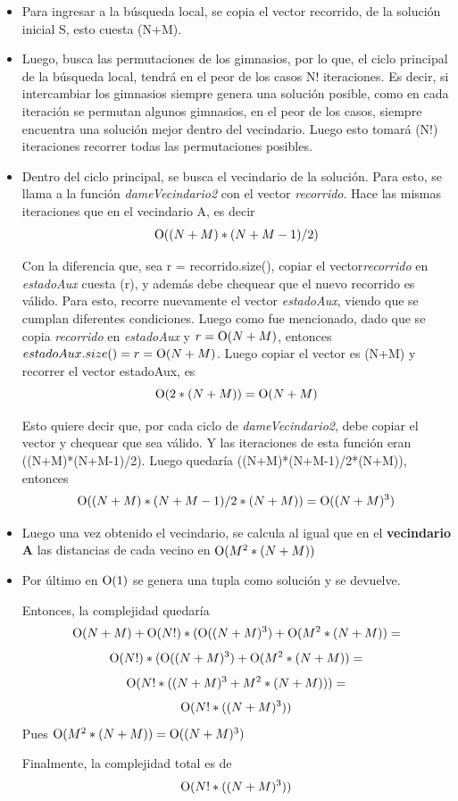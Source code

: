         \begin{itemize}
            \item Para ingresar a la búsqueda local, se copia el vector recorrido, de la solución inicial S, esto cuesta \ord(N+M).
            \item Luego, busca las permutaciones de los gimnasios, por lo que, el ciclo principal de la búsqueda local, tendrá en el peor de los casos N! iteraciones. Es decir, si intercambiar los gimnasios siempre genera una solución posible, como en cada iteración se permutan algunos gimnasios, en el peor de los casos, siempre encuentra una solución mejor dentro del vecindario. Luego esto tomará \ord(N!) iteraciones recorrer todas las permutaciones posibles.
            \item Dentro del ciclo principal, se busca el vecindario de la solución. Para esto, se llama a la función \emph{dameVecindario2} con el vector \emph{recorrido}. Hace las mismas iteraciones que en el vecindario A, es decir 
            \[
                \operatorname{O}((N+M)*(N+M-1)/2)
            \]

            Con la diferencia que, sea r = recorrido.size(), copiar el vector\emph{recorrido} en \emph{estadoAux} cuesta \ord(r), y además debe chequear que el nuevo recorrido es válido. Para esto, recorre nuevamente el vector \emph{estadoAux}, viendo que se cumplan diferentes condiciones. Luego como fue mencionado, dado que se copia \emph{recorrido} en \emph{estadoAux} y $r = \operatorname{O}(N + M)$, entonces $estadoAux.size() = r = \operatorname{O}(N+M)$. Luego copiar el vector es \ord(N+M) y recorrer el vector estadoAux, es 
            \[
                \operatorname{O}(2*(N+M)) = \operatorname{O}(N+M)
            \]

            Esto quiere decir que, por cada ciclo de \emph{dameVecindario2}, debe copiar el vector y chequear que sea válido. Y las iteraciones de esta función eran \ord((N+M)*(N+M-1)/2). Luego quedaría \ord((N+M)*(N+M-1)/2*(N+M)), entonces
            \[
                \operatorname{O}((N+M)*(N+M-1)/2*(N+M)) = \operatorname{O}((N+M)^3)
            \]

            \item Luego una vez obtenido el vecindario, se calcula al igual que en el \textbf{vecindario A} las distancias de cada vecino en $\operatorname{O}(M^{2} * (N+M))$
            \item Por último en $\operatorname{O}(1)$ se genera una tupla como solución y se devuelve.

            Entonces, la complejidad quedaría
        \[
            \operatorname{O}(N+M) + \operatorname{O}(N!)*(\operatorname{O}((N+M)^{3}) + \operatorname{O}(M^{2}*(N+M)) =
        \]
        \[
            \operatorname{O}(N!)*(\operatorname{O}((N+M)^{3}) + \operatorname{O}(M^{2}*(N+M)) =
        \]
        \[
            \operatorname{O}(N!*((N+M)^{3} + M^{2}*(N+M))) =
        \]
        \[
            \operatorname{O}(N!*((N+M)^{3}))
        \]
        Pues $\operatorname{O}(M^{2}*(N+M)) = \operatorname{O}((N+M)^{3})$

        Finalmente, la complejidad total es de
        \[
            \operatorname{O}(N!*((N+M)^{3}))
        \] 

        \end{itemize}


